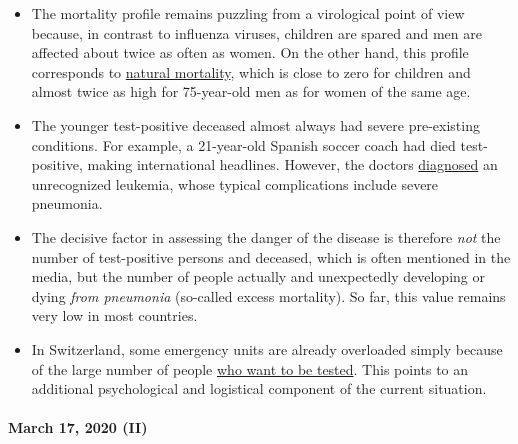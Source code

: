 \begin{itemize}
\tightlist
\item
  The mortality profile remains puzzling from a virological point of
  view because, in contrast to influenza viruses, children are spared
  and men are affected about twice as often as women. On the other hand,
  this profile corresponds to
  \href{http://www.gbe-bund.de/gbe10/abrechnung.prc_abr_test_logon?p_uid=gast\&p_aid=0\&p_knoten=FID\&p_sprache=D\&p_suchstring=820}{natural
  mortality}, which is close to zero for children and almost twice as
  high for 75-year-old men as for women of the same age.
\item
  The younger test-positive deceased almost always had severe
  pre-existing conditions. For example, a 21-year-old Spanish soccer
  coach had died test-positive, making international headlines. However,
  the doctors
  \href{https://sports.yahoo.com/spanish-football-coach-francisco-garcia-163153573.html}{diagnosed}
  an unrecognized leukemia, whose typical complications include severe
  pneumonia.
\item
  The decisive factor in assessing the danger of the disease is
  therefore \emph{not} the number of test-positive persons and deceased,
  which is often mentioned in the media, but the number of people
  actually and unexpectedly developing or dying \emph{from pneumonia}
  (so-called excess mortality). So far, this value remains very low in
  most countries.
\item
  In Switzerland, some emergency units are already overloaded simply
  because of the large number of people
  \href{https://insideparadeplatz.ch/2020/03/16/notfall-stationen-bereits-seit-tagen-am-anschlag/}{who
  want to be tested}. This points to an additional psychological and
  logistical component of the current situation.
\end{itemize}

\hypertarget{march-17-2020-ii}{%
\paragraph{March 17, 2020 (II)}\label{march-17-2020-ii}}

